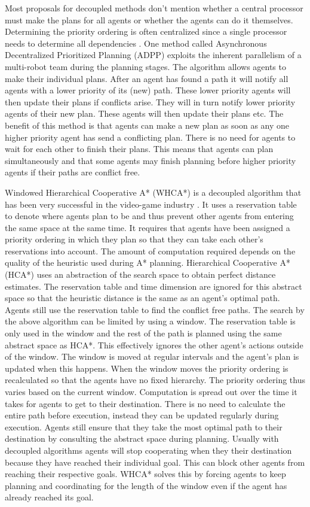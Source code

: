 Most proposals for decoupled methods don't mention whether a central processor
must make the plans for all agents or whether the agents can do it themselves.
Determining the priority ordering is often centralized since a
single processor needs to determine all dependencies \cite{bennewitz2002}. One
method called Asynchronous Decentralized Prioritized Planning (ADPP)
\cite{cap2012} exploits the inherent parallelism of a multi-robot team during
the planning stages. The algorithm allows
agents to make their individual plans. After an agent has found a path it will
notify all agents with a lower priority of its (new) path. These lower priority
agents will then update their plans if conflicts arise. They will in turn
notify lower priority agents of their new plan. These agents will then update
their plans etc. The benefit of
this method is that agents can make a new plan as soon as any one higher
priority agent has send a conflicting plan. There is no need for agents to
wait for each other to finish their plans. This means that agents can plan
simultaneously and that some agents may finish planning before higher priority
agents if their paths are conflict free.

Windowed Hierarchical Cooperative A* (WHCA*) is a decoupled algorithm that has
been very successful in the video-game industry \cite{silver2005,botea2013}. It
uses a
reservation table to denote where agents plan to be and thus prevent other
agents from entering the same space at the same time. It requires that agents
have been assigned a priority ordering in which they plan so that they can take
each other's reservations into account. The amount of computation required
depends on the quality of the heuristic used during A* planning. Hierarchical
Cooperative A* (HCA*) uses an abstraction of the search space to obtain perfect
distance estimates. The reservation table and time dimension are ignored for
this abstract space so that the heuristic distance is the same as an agent's
optimal path. Agents still use the reservation table to find the conflict free
paths. The search by the above algorithm can be limited by using a window. The
reservation table is only used in the window and the rest of the path is
planned using the same abstract space as HCA*. This effectively ignores the
other agent's actions outside of the window. The window is moved at regular
intervals and the agent's plan is updated when this happens. When the window 
moves the priority ordering is recalculated so that
the agents have no fixed hierarchy. The priority ordering thus varies based on 
the
current window. Computation is spread out over the time it takes for agents to
get to their destination. There is no need to calculate the entire path before
execution, instead they can be updated regularly during execution. Agents still
ensure that they take the most optimal path to their destination by consulting
the abstract space during planning. Usually with decoupled algorithms agents 
will stop cooperating when they their destination because they have reached 
their individual goal. This can
block other agents from reaching their respective goals. WHCA* solves this by 
forcing
agents to keep planning and coordinating for the length of the window even if
the agent has already reached its goal.

